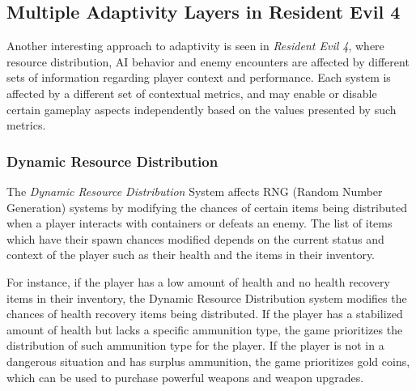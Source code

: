 \subsection{Multiple Adaptivity Layers in Resident Evil 4}



Another interesting approach to adaptivity is seen in \emph{Resident Evil 4}, where resource distribution, AI behavior and enemy encounters are affected by different sets of information regarding player context and performance. Each system is affected by a different set of contextual metrics, and may enable or disable certain gameplay aspects independently based on the values presented by such metrics.

\subsubsection{Dynamic Resource Distribution}

The \emph{Dynamic Resource Distribution} System affects RNG (Random Number Generation) systems by modifying the chances of certain items being distributed when a player interacts with containers or defeats an enemy. The list of items which have their spawn chances modified depends on the current status and context of the player such as their health and the items in their inventory.

For instance, if the player has a low amount of health and no health recovery items in their inventory, the Dynamic Resource Distribution system modifies the chances of health recovery items being distributed. If the player has a stabilized amount of health but lacks a specific ammunition type, the game prioritizes the distribution of such ammunition type for the player. If the player is not in a dangerous situation and has surplus ammunition, the game prioritizes gold coins, which can be used to purchase powerful weapons and weapon upgrades. 

